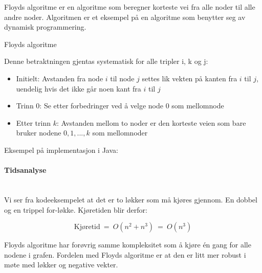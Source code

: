 Floyds algoritme er en algoritme som beregner korteste vei fra alle noder til alle andre noder. Algoritmen er et eksempel på en algoritme som benytter seg av dynamisk programmering. 

\begin{theorem} Floyds algoritme

Denne betraktningen gjentas systematisk for alle tripler i, k og j:
\begin{itemize}
\item Initielt: Avstanden fra node $ i $ til node $ j $ settes lik vekten på kanten fra $ i $ til $ j $, uendelig hvis det ikke går noen kant fra $ i $ til $ j $
\item Trinn 0: Se etter forbedringer ved å velge node 0 som mellomnode
\item Etter trinn $ k $: Avstanden mellom to noder er den korteste veien som bare bruker nodene $ 0, 1, ... , k $ som mellomnoder
\end{itemize}
\end{theorem}

\noindent Eksempel på implementasjon i Java:

\paragraph{Tidsanalyse}~\\
Vi ser fra kodeeksempelet at det er to løkker som må kjøres gjennom. En dobbel og en trippel for-løkke. Kjøretiden blir derfor:

\[ \text{Kjøretid} ~=~ O\left(n^2 + n^3\right)  ~=~ O\left(n^3\right) \]

\noindent Floyds algoritme har forøvrig samme kompleksitet som å kjøre  én gang for alle nodene i grafen. Fordelen med Floyds algoritme er at den er litt mer robust i møte med løkker og negative vekter. 


